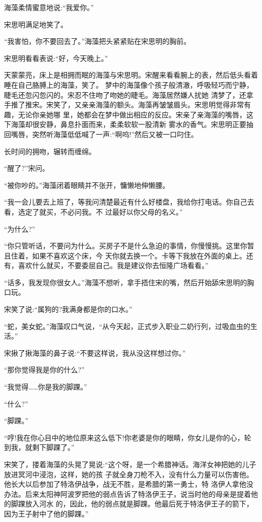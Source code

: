 \documentclass[11pt,a4paper,onecolumn]{article}
\begin{document}
海藻柔情蜜意地说:``我爱你。''

宋思明满足地笑了。

``我害怕，你不要回去了。''海藻把头紧紧贴在宋思明的胸前。

宋思明看看表说:``好，今天晚上。''

天蒙蒙亮，床上是相拥而眠的海藻与宋思明。宋醒来看看腕上的表，然后低头看着睡在自己胳膊上的海藻，笑了。
梦中的海藻像个孩子般清澈，呼吸轻巧而宁静，睫毛还忽闪忽闪的。宋忍不住吻了吻她的睫毛。海藻居然嫌人扰她
清梦了，还拿手推了推宋。宋笑了，又亲亲海藻的额头。海藻再皱皱眉头。宋思明觉得非常有趣，无论你亲她哪
里，她都会在梦中做出相应的反应。宋亲了亲海藻的嘴唇，这下海藻却很安静，鼻息扑面而来，柔柔软软一股清新
雾水的香气。宋思明正要抽回嘴唇，突然听海藻低低喊了一声:``啊呜!''然后又被一口叼住。

长时间的拥吻，辗转而缠绵。

``醒了?''宋问。

``被你吵的。''海藻闭着眼睛并不张开，慵懒地伸懒腰。

``我一会儿要去上班了，等我问清楚最近有什么好楼盘，我给你打电话。你自己去看，选定了就买，不必问我。不
过最好以你父母的名义。''

``为什么?''

``你只管听话，不要问为什么。买房子不是什么急迫的事情，你慢慢挑。这里你暂且住着，如果不喜欢这个床，今
天你就去换一个。卡等下我放在外面的桌上。还有，喜欢什么就买，不要委屈自己。我是建议你去恒隆广场看看。''

``话多，我发现你很女人。''海藻不想听，拿手捂住宋的嘴，然后开始舔宋思明的胸口玩。

宋笑了说:``属狗的?我满身都是你的口水。''

``蛇，美女蛇。''海藻叹口气说，``从今天起，正式步入职业二奶行列，过吸血虫的生活。''

宋揪了揪海藻的鼻子说:``不要这样说，我从没这样想过你。''

``那你觉得我是你的什么?''

``我觉得……你是我的脚踝。''

``什么?''

``脚踝。''

``哼!我在你心目中的地位原来这么低下!你老婆是你的眼睛，你女儿是你的心，轮到我，就剩下脚踝了。''

宋笑了，搂着海藻的头晃了晃说:``这个呀，是一个希腊神话。海洋女神把她的儿子放进冥河中浸泡，这样，她的孩
子就全身刀枪不入，没有什么力量可以伤害他。他长大以后参加了特洛伊战争，战无不胜，是希腊的第一勇士，特
洛伊人拿他没办法。后来太阳神阿波罗把他的弱点告诉了特洛伊王子，说当时他的母亲是提着他的脚踝放入河水
的，因此，他的弱点就是脚踝。他最后死于特洛伊王子的箭下，因为王子射中了他的脚踝。''
\end{document}
